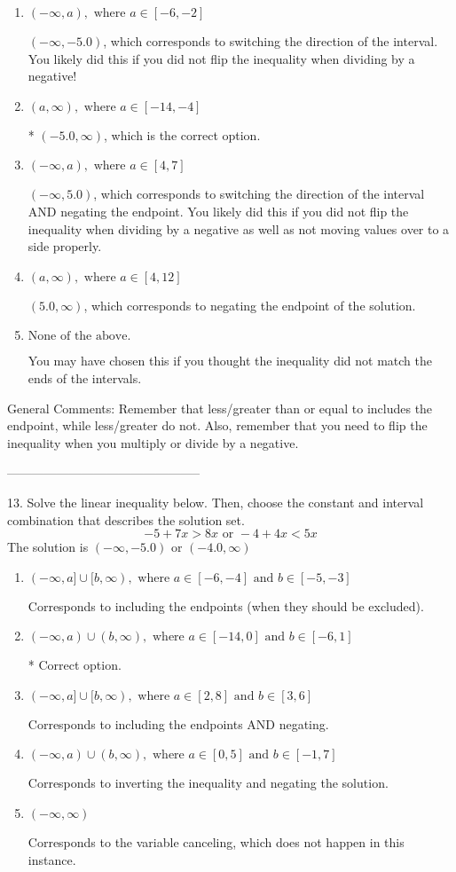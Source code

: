 \documentclass{extbook}[14pt]
\begin{document}
\begin{enumerate}[label=\Alph*.] 
\item $ (-\infty, a), \text{ where } a \in [-6, -2] $ 

  $(-\infty, -5.0)$, which corresponds to switching the direction of the interval. You likely did this if you did not flip the inequality when dividing by a negative! 
\item $ (a, \infty), \text{ where } a \in [-14, -4] $ 

 * $(-5.0, \infty)$, which is the correct option. 
\item $ (-\infty, a), \text{ where } a \in [4, 7] $ 

  $(-\infty, 5.0)$, which corresponds to switching the direction of the interval AND negating the endpoint. You likely did this if you did not flip the inequality when dividing by a negative as well as not moving values over to a side properly. 
\item $ (a, \infty), \text{ where } a \in [4, 12] $ 

  $(5.0, \infty)$, which corresponds to negating the endpoint of the solution. 
\item $ \text{None of the above}. $ 

 You may have chosen this if you thought the inequality did not match the ends of the intervals. 
\end{enumerate} 
 
General Comments: Remember that less/greater than or equal to includes the endpoint, while less/greater do not. Also, remember that you need to flip the inequality when you multiply or divide by a negative.

-----------------------------------------------

13. Solve the linear inequality below. Then, choose the constant and interval combination that describes the solution set.
\[ -5 + 7 x > 8 x \text{ or } -4 + 4 x < 5 x \] 
The solution is $ (-\infty, -5.0) \text{ or } (-4.0, \infty) $ 

\begin{enumerate}[label=\Alph*.] 
\item $ (-\infty, a] \cup [b, \infty), \text{ where } a \in [-6, -4] \text{ and } b \in [-5, -3] $ 

 Corresponds to including the endpoints (when they should be excluded). 
\item $ (-\infty, a) \cup (b, \infty), \text{ where } a \in [-14, 0] \text{ and } b \in [-6, 1] $ 

  * Correct option. 
\item $ (-\infty, a] \cup [b, \infty), \text{ where } a \in [2, 8] \text{ and } b \in [3, 6] $ 

 Corresponds to including the endpoints AND negating. 
\item $ (-\infty, a) \cup (b, \infty), \text{ where } a \in [0, 5] \text{ and } b \in [-1, 7] $ 

 Corresponds to inverting the inequality and negating the solution. 
\item $ (-\infty, \infty) $ 

 Corresponds to the variable canceling, which does not happen in this instance. 
\end{enumerate} 
 
\end{document}
